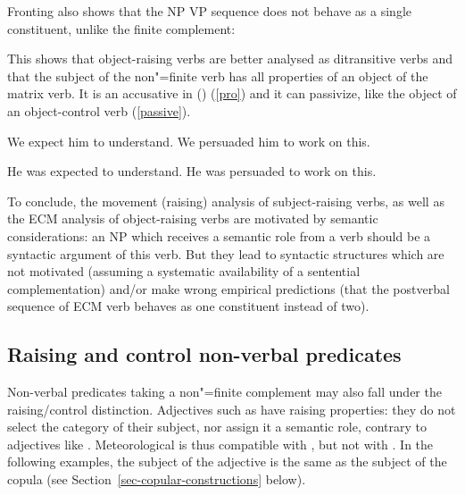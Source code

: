 \documentclass[output=paper
	        ,collection
	        ,collectionchapter
 	        ,biblatex
                ,babelshorthands
                ,newtxmath
                ,draftmode
                ,colorlinks, citecolor=brown
]{langscibook}
\begin{document}
\eal
{}
\zl

Fronting also shows that the NP VP sequence does not behave as a single constituent, unlike the finite complement:

\eal
{}
\zl


This shows that object-raising verbs are better analysed as ditransitive verbs and that the subject of the non"=finite verb has all properties of an object of the matrix verb. It is an accusative in  () (\ref{pro}) and it can passivize, like the object of an object-control verb (\ref{passive}).

\begin{exe}
\ex
\begin{xlist} \label{pro}
\ex We expect him to understand.
\ex  We persuaded him to work on this.
\end{xlist}
\ex \begin{xlist} \label{passive}
\ex  He was expected to understand.
\ex  He was persuaded to work on this.
\end{xlist}
	
\end{exe}


To conclude, the movement (raising) analysis of subject-raising verbs, as well as the ECM analysis of object-raising verbs are motivated by semantic considerations: an NP which receives a semantic role from a verb should be a syntactic argument of this verb. But they lead to syntactic structures which are not motivated (assuming a systematic availability of a sentential complementation) and/or make wrong empirical predictions (that the postverbal sequence of ECM verb behaves as one constituent instead of two).
 
\subsection{Raising and control non-verbal predicates}\label{nonverbal}

Non-verbal predicates taking a non"=finite complement may also fall under the raising/control distinction.  Adjectives such as  have raising properties: they do not select the category of their subject, nor assign it a semantic role, contrary to adjectives like . Meteorological  is thus compatible with , but not with . In the following examples, the subject of the adjective is the same as the subject of the copula (see Section~\ref{sec-copular-constructions} below).
\end{document}

